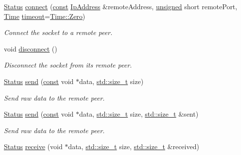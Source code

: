 \begin{DoxyCompactItemize}
\hyperlink{classsf_1_1_socket_a51bf0fd51057b98a10fbb866246176dc}{Status} \hyperlink{classsf_1_1_tcp_socket_a68cd42d5ab70ab54b16787f555951c40}{connect} (\hyperlink{term__entry_8h_a57bd63ce7f9a353488880e3de6692d5a}{const} \hyperlink{classsf_1_1_ip_address}{Ip\-Address} \&remote\-Address, \hyperlink{curses_8priv_8h_aca40206900cfc164654362fa8d4ad1e6}{unsigned} short remote\-Port, \hyperlink{classsf_1_1_time}{Time} \hyperlink{_ndk_8cpp_a174cf046f3b5dbb1258515b3f138b8c7}{timeout}=\hyperlink{classsf_1_1_time_aa343e67f43a940e7b3b51aa10a495f2f}{Time\-::\-Zero})
\begin{DoxyCompactList}\small\item\em Connect the socket to a remote peer. \end{DoxyCompactList}\item 
void \hyperlink{classsf_1_1_tcp_socket_ac18f518a9be3d6be5e74b9404c253c1e}{disconnect} ()
\begin{DoxyCompactList}\small\item\em Disconnect the socket from its remote peer. \end{DoxyCompactList}\item 
\hyperlink{classsf_1_1_socket_a51bf0fd51057b98a10fbb866246176dc}{Status} \hyperlink{classsf_1_1_tcp_socket_affce26ab3bcc4f5b9269dad79db544c0}{send} (\hyperlink{term__entry_8h_a57bd63ce7f9a353488880e3de6692d5a}{const} void $\ast$data, \hyperlink{nc__alloc_8h_a7b60c5629e55e8ec87a4547dd4abced4}{std\-::size\-\_\-t} size)
\begin{DoxyCompactList}\small\item\em Send raw data to the remote peer. \end{DoxyCompactList}\item 
\hyperlink{classsf_1_1_socket_a51bf0fd51057b98a10fbb866246176dc}{Status} \hyperlink{classsf_1_1_tcp_socket_a31f5b280126a96c6f3ad430f4cbcb54d}{send} (\hyperlink{term__entry_8h_a57bd63ce7f9a353488880e3de6692d5a}{const} void $\ast$data, \hyperlink{nc__alloc_8h_a7b60c5629e55e8ec87a4547dd4abced4}{std\-::size\-\_\-t} size, \hyperlink{nc__alloc_8h_a7b60c5629e55e8ec87a4547dd4abced4}{std\-::size\-\_\-t} \&sent)
\begin{DoxyCompactList}\small\item\em Send raw data to the remote peer. \end{DoxyCompactList}\item 
\hyperlink{classsf_1_1_socket_a51bf0fd51057b98a10fbb866246176dc}{Status} \hyperlink{classsf_1_1_tcp_socket_a90ce50811ea61d4f00efc62bb99ae1af}{receive} (void $\ast$data, \hyperlink{nc__alloc_8h_a7b60c5629e55e8ec87a4547dd4abced4}{std\-::size\-\_\-t} size, \hyperlink{nc__alloc_8h_a7b60c5629e55e8ec87a4547dd4abced4}{std\-::size\-\_\-t} \&received)

\end{DoxyCompactItemize}
